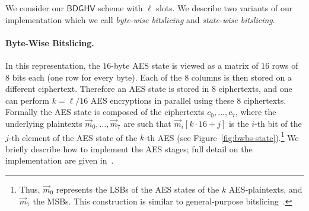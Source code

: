 \documentclass[11pt]{llncs}
\newcommand*{\BDGHV}{\ensuremath{\mathsf{BDGHV}}}
\newcommand*\bwbs{byte-wise bitslicing\xspace}
\newcommand*\swbs{state-wise bitslicing\xspace}
\begin{document}
We consider our $\BDGHV$ scheme with $\ell$ slots. We describe two
variants of our implementation which we call \emph{\bwbs} and
\emph{\swbs}.

\paragraph{Byte-Wise Bitslicing.} In this representation, the
$16$-byte AES state is viewed as a matrix of $16$ rows of $8$ bits
each (one row for every byte). Each of the $8$ columns is then stored on a different
ciphertext. Therefore an AES state is stored in $8$
ciphertexts, and one can perform
$k=\ell/16$ AES encryptions in parallel using these $8$
ciphertexts. Formally the AES state is composed of the ciphertexts $c_0,\ldots,c_7$, where
the underlying plaintexts $\vec m_0,\ldots,\vec m_7$ are such that
$\vec m_i[k\cdot 16+j]$ is the $i$-th bit of the $j$-th element of the AES
state of the $k$-th AES (see Figure~\ref{fig:bwbs-state}).\footnote{
Thus, $\vec m_0$ represents the LSBs
  of the AES states of the $k$ AES-plaintexts, and $\vec m_7$ the
  MSBs. This construction is similar to general-purpose
  bitslicing~\cite{Bih1997,KS2009}.} We briefly
describe how to implement the AES stages; full detail 
on the implementation are given in~\cite{CLT2013a}. 
\end{document}
